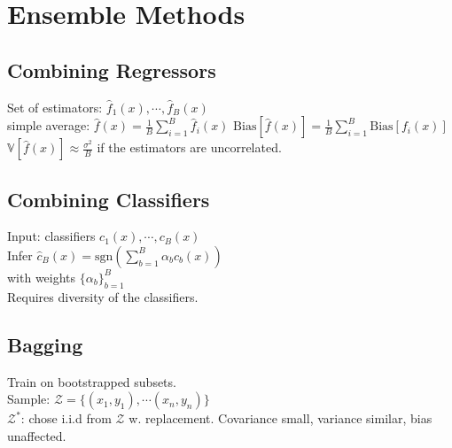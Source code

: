 \section*{Ensemble Methods}
\subsection*{Combining Regressors}
Set of estimators: $\hat{f}_1(x), \cdots, \hat{f}_B(x)$\\
simple average: $\hat{f}(x) = \frac{1}{B}\sum_{i=1}^B\hat{f}_i(x)$
$\mathrm{Bias}[\hat{f}(x)]=\frac{1}{B}\sum_{i=1}^B\mathrm{Bias}[f_i(x)]$\\
$\mathbb{V}[\hat{f}(x)]\approx\frac{\sigma^2}{B}$ if the estimators are uncorrelated.

\subsection*{Combining Classifiers}
Input: classifiers $c_1(x),\cdots,c_B(x)$\\
Infer $\hat{c}_B(x){=}\text{sgn}(\sum_{b=1}^B\alpha_b c_b(x))$\\
with weights $\{\alpha_b\}_{b=1}^B $\\
Requires diversity of the classifiers.

\subsection*{Bagging}
Train on bootstrapped subsets.\\
Sample: $\mathcal{Z}=\{(x_1,y_1),\cdots(x_n,y_n)\}$\\
$\mathcal{Z}^*$: chose i.i.d from $\mathcal{Z}$ w. replacement. Covariance small, variance similar, bias unaffected.


